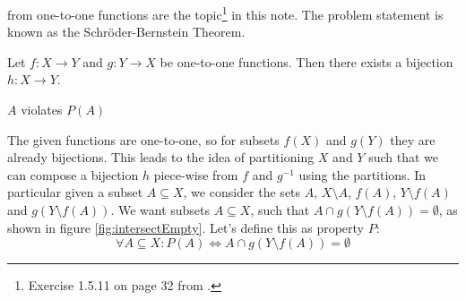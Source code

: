  from one-to-one functions are the topic\footnote{Exercise 1.5.11 on page 32 from .} in this note. The problem statement is known as the Schr\"oder-Bernstein Theorem. 

\vspace{10 mm}
\begin{problem}
Let $f:X \to Y$ and $g:Y \to X$ be one-to-one functions. Then there exists a bijection $h:X \to Y$.	     
\end{problem}

\begin{marginfigure}[1.0in]
\caption{$A$ violates $P(A)$}
\label{fig:intersectNotEmpty}
\end{marginfigure}

The given functions are one-to-one, so for subsets $f(X)$ and $g(Y)$ they are already bijections. This leads to the idea of partitioning $X$ and $Y$ such that we can compose a bijection $h$ piece-wise from $f$ and $g^{-1}$ using the partitions. In particular given a subset $A \subseteq X$, we consider the sets $A$, $X \setminus A$, $f(A)$, $Y \setminus f(A)$ and $g(Y \setminus f(A))$. We want subsets $A \subseteq X$, such that $A \cap g(Y \setminus f(A)) = \emptyset$, as shown in figure \ref{fig:intersectEmpty}. Let's define this as property $P$:
$$
\forall A \subseteq X: P(A) \Leftrightarrow A \cap g(Y \setminus f(A)) = \emptyset
$$


